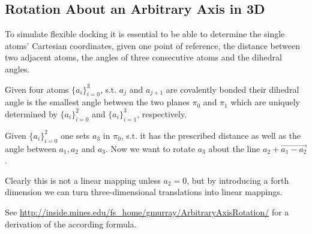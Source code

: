 \subsection{Rotation About an Arbitrary Axis in 3D}
To simulate flexible docking it is essential to be able to determine the single atoms' Cartesian coordinates, given one point of reference, the distance between two adjacent atoms, the angles of three consecutive atoms and the dihedral angles.

Given four atoms $\{a_i\}_{i=0}^3$, s.t. $a_j$ and $a_{j+1}$ are covalently bonded their dihedral angle is the smallest angle between the two planes $\pi_0$ and $\pi_1$ which are uniquely determined by $\{a_i\}_{i=0}^2$ and $\{a_i\}_{i=1}^3$, respectively.

Given $\{a_i\}_{i=0}^2$ one sets $a_3$ in $π_0$, s.t. it has the prescribed distance as well as the angle between $a_1,a_2$ and $a_3$.
Now we want to rotate $a_3$ about the line $a_2 + \overrightarrow{a_1-a_2}$.

Clearly this is not a linear mapping unless $a_2=0$, but by introducing a forth dimension we can turn three-dimensional translations into linear mappings.

See \url{http://inside.mines.edu/fs_home/gmurray/ArbitraryAxisRotation/} for a derivation of the according formula.





